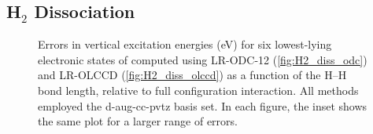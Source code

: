 \subsection{H$_2$ Dissociation}
\label{sec:two_electron}

\begin{figure}[h!]
     \qquad
     \quad
    \captionsetup{justification=raggedright,singlelinecheck=false}
    \caption{%
        \label{fig:H2_diss}
        Errors in vertical excitation energies (eV) for six lowest-lying
        electronic states of  computed using LR-ODC-12
        (\ref{fig:H2_diss_odc}) and LR-OLCCD (\ref{fig:H2_diss_olccd}) as a
        function of the H--H bond length, relative to full configuration
        interaction.
        All methods employed the d-aug-cc-pvtz basis set.
        In each figure, the inset shows the same plot for a larger range of
        errors.
    }
\end{figure}

